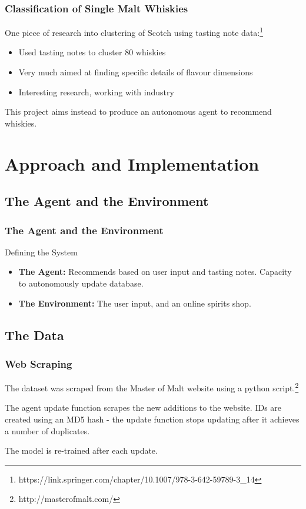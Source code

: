 \documentclass{beamer}
\begin{document}
\begin{frame}
    \frametitle{Classification of Single Malt Whiskies}
    One piece of research into clustering of Scotch using tasting note data:\footnote{https://link.springer.com/chapter/10.1007/978-3-642-59789-3\_14}
    \begin{itemize}
        \item Used tasting notes to cluster 80 whiskies
        \item Very much aimed at finding specific details of flavour dimensions
        \item Interesting research, working with industry
    \end{itemize}
    This project aims instead to produce an autonomous agent to recommend whiskies.
\end{frame}

\section{Approach and Implementation} 

\subsection{The Agent and the Environment}
\begin{frame}
    \frametitle{The Agent and the Environment}
    \begin{block}{Defining the System}
    \begin{itemize}
        \item \textbf{The Agent:} Recommends based on user input and 
        tasting notes. Capacity to autonomously update database.
        \item \textbf{The Environment:} The user input, and an online spirits
        shop.
    \end{itemize}
\end{block}
\end{frame}

\subsection{The Data}
\begin{frame}
    \frametitle{Web Scraping}
    The dataset was scraped from the Master of Malt website using a python 
script.\footnote{http://masterofmalt.com/}

The agent update function scrapes the new additions to the website. 
IDs are created using an MD5 hash - the update function stops updating 
after it achieves a number of duplicates.

The model is re-trained after each update.
\end{frame}
\end{document}
